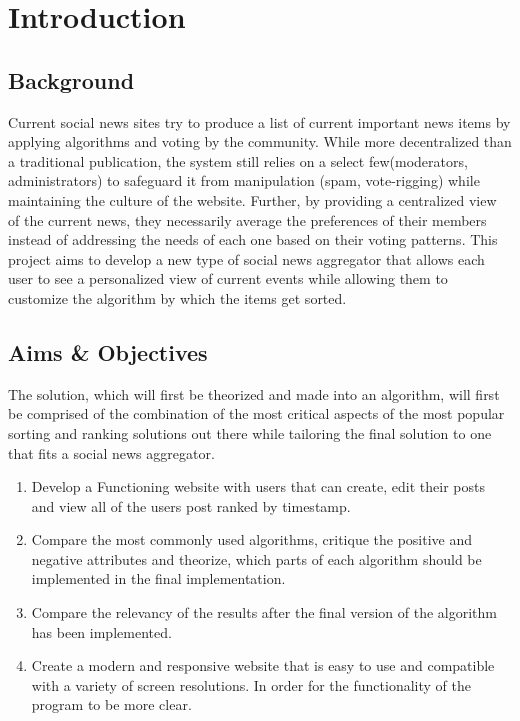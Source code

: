 
\chapter{Introduction}

\section{Background}
Current social news sites try to produce a list of current important news items by applying algorithms
and voting by the community. While more decentralized than a traditional publication, the system still
relies on a select few(moderators, administrators) to safeguard it from manipulation (spam, vote-rigging)
while maintaining the culture of the website. Further, by providing a centralized view of the current news,
they necessarily average the preferences of their members instead of addressing the needs of each one based on their voting patterns. This project aims to develop a new type of social news aggregator that allows each user to see a personalized view of current events while allowing them to customize the algorithm by which the items get sorted.

\section {Aims \& Objectives}
The solution, which will first be theorized and made into an algorithm, will first be comprised of the combination of the most critical aspects of the most popular sorting and ranking solutions out there while tailoring the final solution to one that fits a social news aggregator.

\begin{enumerate}
\item Develop a Functioning website with users that can create, edit their posts and view all of the users post ranked by timestamp.
\item Compare the most commonly used algorithms, critique the positive and negative attributes and theorize, which parts of each algorithm should be implemented in the final implementation.
\item Compare the relevancy of the results after the final version of the algorithm has been implemented.
\item Create a modern and responsive website that is easy to use and compatible with a variety of screen resolutions. In order for the functionality of the program to be more clear.
\end{enumerate}

